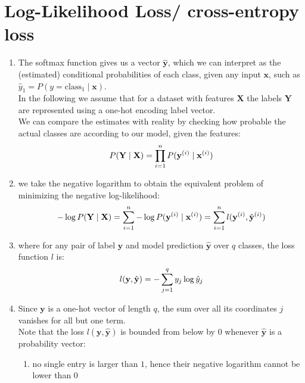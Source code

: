 \section{Log-Likelihood Loss/ cross-entropy loss \cite{dnn-1}} \label{Log-Likelihood Loss/ cross-entropy loss}

\begin{enumerate}[itemsep=0.2cm]
    \item The softmax function gives us a vector $\hat{\mathbf{y}}$, which we can interpret as the (estimated) conditional probabilities of each class, given any input $\mathbf{x}$, such as $\hat{y}_1 = P(y=\textrm{class$_1$} \mid \mathbf{x})$.\\
    In the following we assume that for a dataset with features $\mathbf{X}$ the labels $\mathbf{Y}$ are represented using a one-hot encoding label vector.\\
    We can compare the estimates with reality by checking how probable the actual classes are according to our model, given the features:
    \[
        \hfill
        P(\mathbf{Y} \mid \mathbf{X}) 
        = \prod_{i=1}^n P(\mathbf{y}^{(i)} \mid \mathbf{x}^{(i)})
        \hfill
    \]

    \item we take the negative logarithm to obtain the equivalent problem of minimizing the negative log-likelihood:
    \[
        \hfill
        -\log P(\mathbf{Y} \mid \mathbf{X}) 
        = \dsum_{i=1}^n -\log P(\mathbf{y}^{(i)} \mid \mathbf{x}^{(i)})
        = \dsum_{i=1}^n l(\mathbf{y}^{(i)}, \hat{\mathbf{y}}^{(i)})
        \hfill
    \]

    \item where for any pair of label $\mathbf{y}$ and model prediction $\hat{\mathbf{y}}$ over $q$ classes, the loss function $l$ is:
    \[
        \hfill
        l(\mathbf{y}, \hat{\mathbf{y}}) = - \dsum_{j=1}^q y_j \log \hat{y}_j
        \hfill
    \]

    \item Since $\mathbf{y}$ is a one-hot vector of length $q$, the sum over all its coordinates $j$ vanishes for all but one term.\\
    Note that the loss $l(\mathbf{y}, \hat{\mathbf{y}})$ is bounded from below by $0$ whenever $\hat{\mathbf{y}}$ is a probability vector: 
    \begin{enumerate}
        \item no single entry is larger than $1$, hence their negative logarithm cannot be lower than $0$


\end{enumerate}
\end{enumerate}
